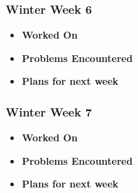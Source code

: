 \documentclass[compsoc,draftclsnofoot,onecolumn,10pt]{IEEEtran}
\begin{document}
\subsubsection{Winter Week 6}
\begin{itemize}
    \item {\textbf{Worked On}}
    \begin{itemize}
        
    \end{itemize}

    \item {\textbf{Problems Encountered}}
    \begin{itemize}
        
    \end{itemize}

    \item{\textbf{Plans for next week}}
    \begin{itemize}
        
    \end{itemize}

\end{itemize}

\subsubsection{Winter Week 7}
\begin{itemize}
    \item {\textbf{Worked On}}
    \begin{itemize}
        
    \end{itemize}

    \item {\textbf{Problems Encountered}}
    \begin{itemize}
        
    \end{itemize}

    \item{\textbf{Plans for next week}}
    \begin{itemize}
        
    \end{itemize}

\end{itemize}
\end{document}
